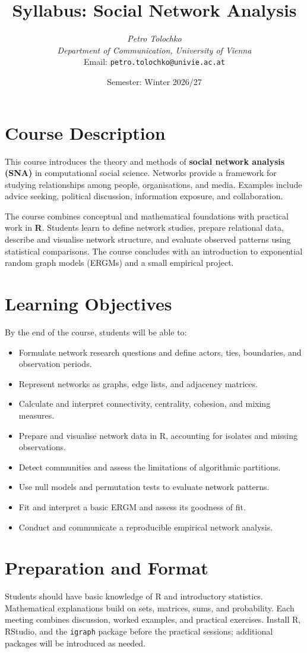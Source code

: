 \documentclass[a4paper,11pt]{article}
\title{\textbf{Syllabus: Social Network Analysis}}
\author{\textit{Petro Tolochko}\\
\textit{Department of Communication, University of Vienna}\\
Email: \texttt{petro.tolochko@univie.ac.at}}
\date{Semester: Winter 2026/27}
\begin{document}
\maketitle

\section*{Course Description}
This course introduces the theory and methods of \textbf{social network analysis (SNA)} in computational social science. Networks provide a framework for studying relationships among people, organisations, and media. Examples include advice seeking, political discussion, information exposure, and collaboration.

The course combines conceptual and mathematical foundations with practical work in \textbf{R}. Students learn to define network studies, prepare relational data, describe and visualise network structure, and evaluate observed patterns using statistical comparisons. The course concludes with an introduction to exponential random graph models (ERGMs) and a small empirical project.

\section*{Learning Objectives}
By the end of the course, students will be able to:
\begin{itemize}
\item Formulate network research questions and define actors, ties, boundaries, and observation periods.
\item Represent networks as graphs, edge lists, and adjacency matrices.
\item Calculate and interpret connectivity, centrality, cohesion, and mixing measures.
\item Prepare and visualise network data in R, accounting for isolates and missing observations.
\item Detect communities and assess the limitations of algorithmic partitions.
\item Use null models and permutation tests to evaluate network patterns.
\item Fit and interpret a basic ERGM and assess its goodness of fit.
\item Conduct and communicate a reproducible empirical network analysis.
\end{itemize}

\section*{Preparation and Format}
Students should have basic knowledge of R and introductory statistics. Mathematical explanations build on sets, matrices, sums, and probability. Each meeting combines discussion, worked examples, and practical exercises. Install R, RStudio, and the \texttt{igraph} package before the practical sessions; additional packages will be introduced as needed.
\end{document}
